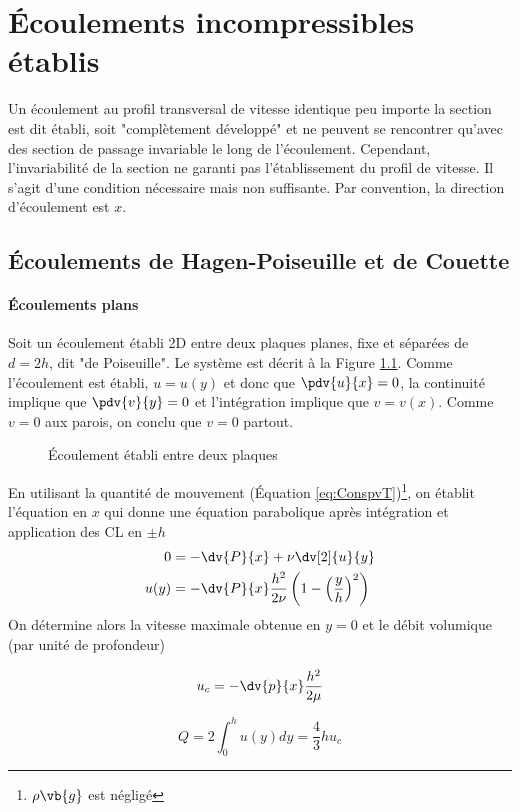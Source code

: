 

\chapter{Écoulements incompressibles établis}
  Un écoulement au profil transversal de vitesse identique peu importe la section est dit établi, soit "complètement développé" et ne peuvent se rencontrer qu'avec des section de passage invariable le long de l'écoulement. Cependant, l'invariabilité de la section ne garanti pas l'établissement du profil de vitesse. Il s'agit d'une condition nécessaire mais non suffisante. Par convention, la direction d'écoulement est $x$.

  \section{Écoulements de Hagen-Poiseuille et de Couette}
      \subsubsection{Écoulements plans}
        Soit un écoulement établi 2D entre deux plaques planes, fixe et séparées de $d=2h$, dit "de Poiseuille". Le système est décrit à la Figure \ref{fig:Poiseuille}. Comme l'écoulement est établi, $u=u(y)$ et donc que $\pdv{u}{x} = 0$, la continuité implique que $\pdv{v}{y} = 0$ et l'intégration implique que $v = v(x)$. Comme $v=0$ aux parois, on conclu que $v = 0$ partout.
        \begin{figure}[h]
          \centering
          
          \caption{Écoulement établi entre deux plaques}
          \label{fig:Poiseuille}
        \end{figure}

        En utilisant la quantité de mouvement (Équation \ref{eq:ConspvT})\footnote{$\rho \vb{g}$ est négligé}, on établit l'équation en $x$ qui donne une équation parabolique après intégration et application des CL en $\pm h$
        \begin{equation}
          \begin{aligned}
            0 &= -\dv{P}{x} + \nu\dv[2]{u}{y} \\ \label{eq:Poiseuille}
            u(y) &= -\dv{P}{x}\frac{h^2}{2\nu} \left(1 - \left(\frac{y}{h}\right)^2\right)
          \end{aligned}
        \end{equation}
        On détermine alors la vitesse maximale obtenue en $y = 0$ et le débit volumique (par unité de profondeur)
        \begin{multicols}{2}
          \begin{equation}
            u_c = -\dv{p}{x} \frac{h^2}{2\mu}
          \end{equation}

          \begin{equation}
            Q = 2\int_0^h u(y)dy = \frac{4}{3} h u_c
          \end{equation}
        \end{multicols}

